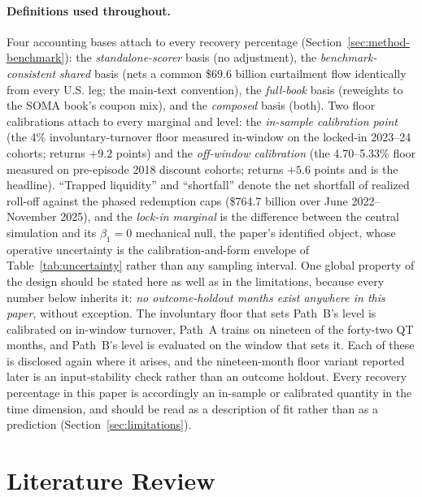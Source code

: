 \documentclass[12pt]{article}
\begin{document}
\paragraph{Definitions used throughout.} Four accounting bases attach to every recovery percentage (Section~\ref{sec:method-benchmark}): the \emph{standalone-scorer} basis (no adjustment), the \emph{benchmark-consistent shared} basis (nets a common \$69.6 billion curtailment flow identically from every U.S. leg; the main-text convention), the \emph{full-book} basis (reweights to the SOMA book's coupon mix), and the \emph{composed} basis (both). Two floor calibrations attach to every marginal and level: the \emph{in-sample calibration point} (the 4\% involuntary-turnover floor measured in-window on the locked-in 2023--24 cohorts; returns $+9.2$ points) and the \emph{off-window calibration} (the 4.70--5.33\% floor measured on pre-episode 2018 discount cohorts; returns $+5.6$ points and is the headline). ``Trapped liquidity'' and ``shortfall'' denote the net shortfall of realized roll-off against the phased redemption caps (\$764.7 billion over June 2022--November 2025), and the \emph{lock-in marginal} is the difference between the central simulation and its $\beta_1 = 0$ mechanical null, the paper's identified object, whose operative uncertainty is the calibration-and-form envelope of Table~\ref{tab:uncertainty} rather than any sampling interval. One global property of the design should be stated here as well as in the limitations, because every number below inherits it: \emph{no outcome-holdout months exist anywhere in this paper}, without exception. The involuntary floor that sets Path~B's level is calibrated on in-window turnover, Path~A trains on nineteen of the forty-two QT months, and Path~B's level is evaluated on the window that sets it. Each of these is disclosed again where it arises, and the nineteen-month floor variant reported later is an input-stability check rather than an outcome holdout. Every recovery percentage in this paper is accordingly an in-sample or calibrated quantity in the time dimension, and should be read as a description of fit rather than as a prediction (Section~\ref{sec:limitations}).

\section{Literature Review}\label{sec:lit}
\end{document}

